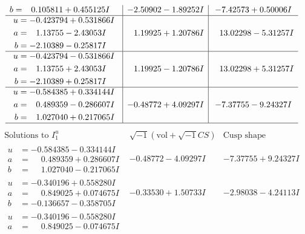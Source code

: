 \documentclass[1p]{elsarticle_modified}
\theoremstyle{definition}
\newcommand{\I}{\sqrt{-1}}
\begin{document}
$$\begin{array}{c|c|c}
\begin{aligned}
b &= \phantom{-}0.105811 + 0.455125 I\end{aligned}
 & -2.50902 - 1.89252 I & -7.42573 + 0.50006 I \\ \hline\begin{aligned}
u &= -0.423794 + 0.531866 I \\
a &= \phantom{-}1.13755 - 2.43053 I \\
b &= -2.10389 - 0.25817 I\end{aligned}
 & \phantom{-}1.19925 + 1.20786 I & \phantom{-}13.02298 - 5.31257 I \\ \hline\begin{aligned}
u &= -0.423794 - 0.531866 I \\
a &= \phantom{-}1.13755 + 2.43053 I \\
b &= -2.10389 + 0.25817 I\end{aligned}
 & \phantom{-}1.19925 - 1.20786 I & \phantom{-}13.02298 + 5.31257 I \\ \hline\begin{aligned}
u &= -0.584385 + 0.334144 I \\
a &= \phantom{-}0.489359 - 0.286607 I \\
b &= \phantom{-}1.027040 + 0.217065 I\end{aligned}
 & -0.48772 + 4.09297 I & -7.37755 - 9.24327 I\\
 \hline 
 \end{array}$$\newpage$$\begin{array}{c|c|c}  
\text{Solutions to }I^u_{1}& \I (\text{vol} + \sqrt{-1}CS) & \text{Cusp shape}\\
 \hline 
\begin{aligned}
u &= -0.584385 - 0.334144 I \\
a &= \phantom{-}0.489359 + 0.286607 I \\
b &= \phantom{-}1.027040 - 0.217065 I\end{aligned}
 & -0.48772 - 4.09297 I & -7.37755 + 9.24327 I \\ \hline\begin{aligned}
u &= -0.340196 + 0.558280 I \\
a &= \phantom{-}0.849025 + 0.074675 I \\
b &= -0.136657 - 0.358705 I\end{aligned}
 & -0.33530 + 1.50733 I & -2.98038 - 4.24113 I \\ \hline\begin{aligned}
u &= -0.340196 - 0.558280 I \\
a &= \phantom{-}0.849025 - 0.074675 I \\

\end{aligned}
\end{array}$$
\end{document}
